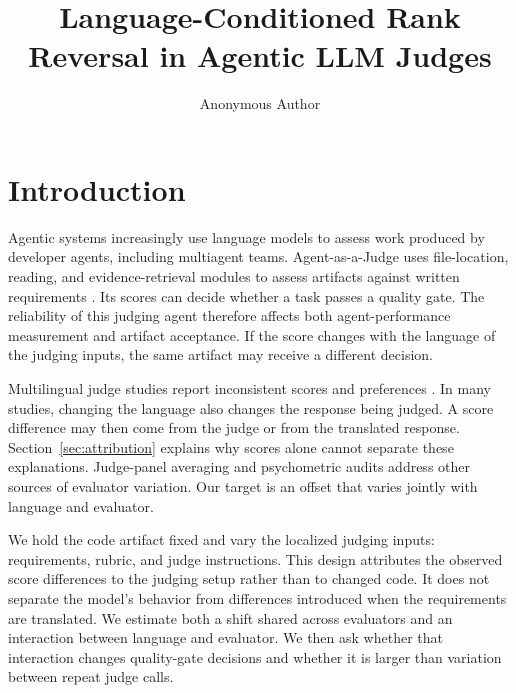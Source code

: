 \documentclass[sigconf,anonymous]{aamas}
\title[Language-Conditioned Rank Reversal in LLM Judges]{Language-Conditioned Rank Reversal in Agentic LLM Judges}
\author{Anonymous Author}
\affiliation{%
  \institution{Anonymous Institution}
  \city{Anonymous City}
  \country{United Kingdom}}
\begin{document}
\maketitle

\section{Introduction}

Agentic systems increasingly use language models to assess work produced
by developer agents, including multiagent teams. Agent-as-a-Judge uses
file-location, reading, and evidence-retrieval modules to assess artifacts
against written requirements \citep{zhuge2024agentjudge}. Its scores can
decide whether a task passes a quality gate. The reliability of this
judging agent therefore affects both agent-performance measurement and
artifact acceptance. If the score changes with the language of the
judging inputs, the same artifact may receive a different decision.

Multilingual judge studies report inconsistent scores and preferences
\citep{hada-etal-2024-large,fu2025reliable,yin2026judgels}. In many studies,
changing the language also changes the response being judged. A score
difference may then come from the judge or from the translated response.
Section~\ref{sec:attribution} explains why scores
alone cannot separate these explanations. Judge-panel averaging and
psychometric audits \citep{zhu2026cyclicjudge,usami2026darkcurrent}
address other sources of evaluator variation. Our target is an offset
that varies jointly with language and evaluator.

We hold the code artifact fixed and vary the localized judging inputs:
requirements, rubric, and judge instructions. This design attributes the
observed score differences to the judging setup rather than to changed code.
It does not separate the model's behavior from differences introduced when
the requirements are translated. We estimate both a shift shared across
evaluators and an interaction between language and evaluator. We then ask
whether that interaction changes quality-gate decisions and whether it is
larger than variation between repeat judge calls.

\end{document}
